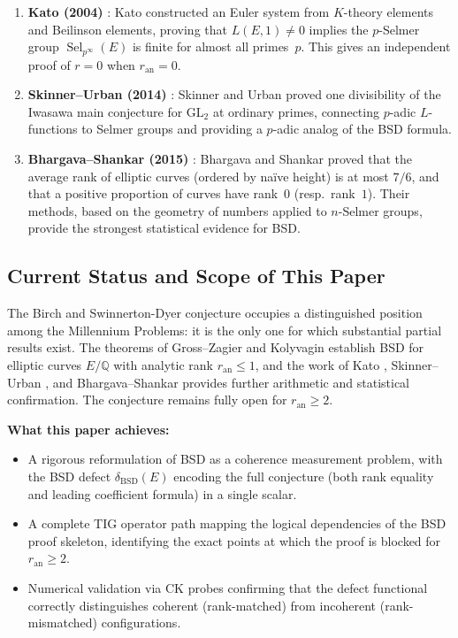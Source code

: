 \documentclass[11pt]{article}
\DeclareMathOperator{\Sel}{Sel}
\begin{document}
\begin{enumerate}
  \item \textbf{Kato (2004)} \cite{Kato}:
    Kato constructed an Euler system from $K$-theory elements and Beilinson
    elements, proving that $L(E,1) \neq 0$ implies the $p$-Selmer group
    $\Sel_{p^\infty}(E)$ is finite for almost all primes~$p$.  This gives an
    independent proof of $r = 0$ when $r_{\mathrm{an}} = 0$.

  \item \textbf{Skinner--Urban (2014)} \cite{SU}:
    Skinner and Urban proved one divisibility of the Iwasawa main conjecture
    for $\mathrm{GL}_2$ at ordinary primes, connecting $p$-adic $L$-functions
    to Selmer groups and providing a $p$-adic analog of the BSD formula.

  \item \textbf{Bhargava--Shankar (2015)} \cite{BS}:
    Bhargava and Shankar proved that the average rank of elliptic curves
    (ordered by na\"{i}ve height) is at most $7/6$, and that a positive proportion
    of curves have rank~$0$ (resp.\ rank~$1$).  Their methods, based on the
    geometry of numbers applied to $n$-Selmer groups, provide the strongest
    statistical evidence for BSD.
\end{enumerate}

\subsection*{Current Status and Scope of This Paper}

The Birch and Swinnerton-Dyer conjecture occupies a distinguished position
among the Millennium Problems: it is the only one for which substantial partial
results exist.  The theorems of Gross--Zagier \cite{GZ} and Kolyvagin
\cite{Koly} establish BSD for elliptic curves $E/\mathbb{Q}$ with analytic rank
$r_{\mathrm{an}} \leq 1$, and the work of Kato \cite{Kato}, Skinner--Urban
\cite{SU}, and Bhargava--Shankar \cite{BS} provides further arithmetic and
statistical confirmation.  The conjecture remains fully open for
$r_{\mathrm{an}} \geq 2$.

\textbf{What this paper achieves:}
\begin{itemize}
  \item A rigorous reformulation of BSD as a coherence measurement problem,
    with the BSD defect $\delta_{\mathrm{BSD}}(E)$ encoding the full conjecture
    (both rank equality and leading coefficient formula) in a single scalar.
  \item A complete TIG operator path mapping the logical dependencies of the
    BSD proof skeleton, identifying the exact points at which the proof is
    blocked for $r_{\mathrm{an}} \geq 2$.
  \item Numerical validation via CK probes confirming that the defect
    functional correctly distinguishes coherent (rank-matched) from
    incoherent (rank-mismatched) configurations.
\end{itemize}
\end{document}
